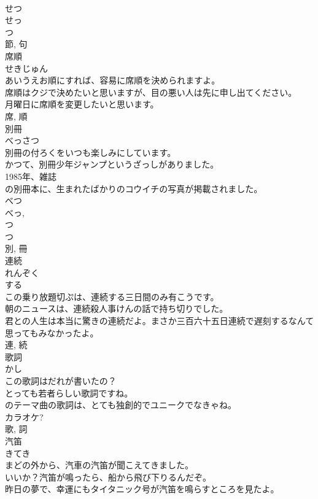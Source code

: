 \documentclass[8pt]{extreport}
\begin{document}
\begin{CJK}{UTF8}{min}
\\	せつ 
\\	せっ 
\\	つ
\\	節, 句	
\\	席順	
\\	せきじゅん	
\\	あいうえお順にすれば、容易に席順を決められますよ。	
\\	席順はクジで決めたいと思いますが、目の悪い人は先に申し出てください。	
\\	月曜日に席順を変更したいと思います。	
\\	席, 順	
\\	別冊	
\\	べっさつ	
\\	別冊の付ろくをいつも楽しみにしています。	
\\	かつて、別冊少年ジャンプというざっしがありました。	
\\	1985年、雑誌
\\	の別冊本に、生まれたばかりのコウイチの写真が掲載されました。	
\\	べつ 
\\	べっ, 
\\	つ 
\\	つ
\\	別, 冊	
\\	連続	
\\	れんぞく	
\\	する 
\\	この乗り放題切ぷは、連続する三日間のみ有こうです。	
\\	朝のニュースは、連続殺人事けんの話で持ち切りでした。	
\\	君との人生は本当に驚きの連続だよ。まさか三百六十五日連続で遅刻するなんて思ってもみなかったよ。	
\\	連, 続	
\\	歌詞	
\\	かし	
\\	この歌詞はだれが書いたの？	
\\	とっても若者らしい歌詞ですね。	
\\	のテーマ曲の歌詞は、とても独創的でユニークでなきゃね。	
\\	カラオケ?	
\\	歌, 詞	
\\	汽笛	
\\	きてき	
\\	まどの外から、汽車の汽笛が聞こえてきました。	
\\	いいか？汽笛が鳴ったら、船から飛び下りるんだぞ。	
\\	昨日の夢で、幸運にもタイタニック号が汽笛を鳴らすところを見たよ。	

\end{CJK}
\end{document}
